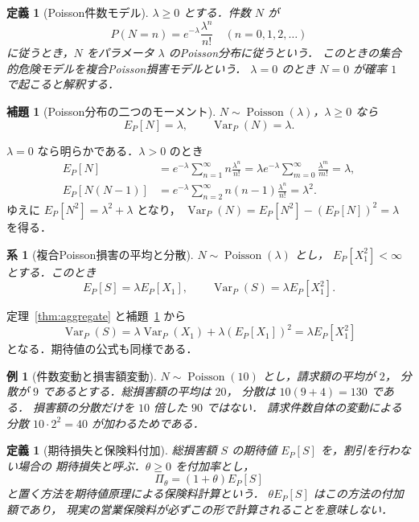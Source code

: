 \documentclass[a5paper,10pt,onecolumn]{jsarticle}
\makeatletter
\theoremstyle{mathnotetheorem}
\newtheorem{definition}[theorem]{定義}
\newtheorem{lemma}[theorem]{補題}
\newtheorem{corollary}[theorem]{系}
\newtheorem{example}[theorem]{例}
\renewcommand{\proofname}{証明}
\renewenvironment{proof}[1][\proofname]{%
  \par\pushQED{\qed}\normalfont\topsep4\p@\@plus2\p@\relax
  \trivlist\item[\hskip\labelsep\bfseries #1]\ignorespaces
}{\popQED\endtrivlist\@endpefalse}
\makeatother
\begin{document}
\begin{definition}[Poisson件数モデル]
$\lambda\ge0$ とする．件数 $N$ が
\[
 P(N=n)=e^{-\lambda}\frac{\lambda^n}{n!}
 \quad(n=0,1,2,\ldots)
\]
に従うとき，$N$ をパラメータ $\lambda$ の\emph{Poisson分布}に従うという．
このときの集合的危険モデルを\emph{複合Poisson損害モデル}という．
$\lambda=0$ のとき $N=0$ が確率 $1$ で起こると解釈する．
\end{definition}

\begin{lemma}[Poisson分布の二つのモーメント]\label{lem:poissonmom}
$N\sim\operatorname{Poisson}(\lambda)$，$\lambda\ge0$ なら
\[
 E_P[N]=\lambda,\qquad
 \operatorname{Var}_P(N)=\lambda.
\]
\end{lemma}
\begin{proof}
$\lambda=0$ なら明らかである．$\lambda>0$ のとき
\begin{align*}
 E_P[N]
 &=e^{-\lambda}\sum_{n=1}^\infty
   n\frac{\lambda^n}{n!}
 =\lambda e^{-\lambda}\sum_{m=0}^\infty\frac{\lambda^m}{m!}
 =\lambda,\\
 E_P[N(N-1)]
 &=e^{-\lambda}\sum_{n=2}^\infty
   n(n-1)\frac{\lambda^n}{n!}
 =\lambda^2.
\end{align*}
ゆえに $E_P[N^2]=\lambda^2+\lambda$ となり，
$\operatorname{Var}_P(N)=E_P[N^2]-(E_P[N])^2=\lambda$ を得る．\end{proof}

\begin{corollary}[複合Poisson損害の平均と分散]\label{cor:compound}
$N\sim\operatorname{Poisson}(\lambda)$ とし，
$E_P[X_1^2]<\infty$ とする．このとき
\[
 E_P[S]=\lambda E_P[X_1],\qquad
 \operatorname{Var}_P(S)=\lambda E_P[X_1^2].
\]
\end{corollary}
\begin{proof}
定理~\ref{thm:aggregate} と補題~\ref{lem:poissonmom} から
\[
 \operatorname{Var}_P(S)
 =\lambda\operatorname{Var}_P(X_1)
 +\lambda(E_P[X_1])^2
 =\lambda E_P[X_1^2]
\]
となる．期待値の公式も同様である．\end{proof}

\begin{example}[件数変動と損害額変動]
$N\sim\operatorname{Poisson}(10)$ とし，請求額の平均が $2$，
分散が $9$ であるとする．総損害額の平均は $20$，
分散は $10(9+4)=130$ である．
損害額の分散だけを $10$ 倍した $90$ ではない．
請求件数自体の変動による分散 $10\cdot2^2=40$ が加わるためである．
\end{example}

\begin{definition}[期待損失と保険料付加]
総損害額 $S$ の期待値 $E_P[S]$ を，割引を行わない場合の
\emph{期待損失}と呼ぶ．$\theta\ge0$ を付加率とし，
\[
 \Pi_{\theta}=(1+\theta)E_P[S]
\]
と置く方法を\emph{期待値原理による保険料計算}という．
$\theta E_P[S]$ はこの方法の付加額であり，
現実の営業保険料が必ずこの形で計算されることを意味しない．
\end{definition}
\end{document}
